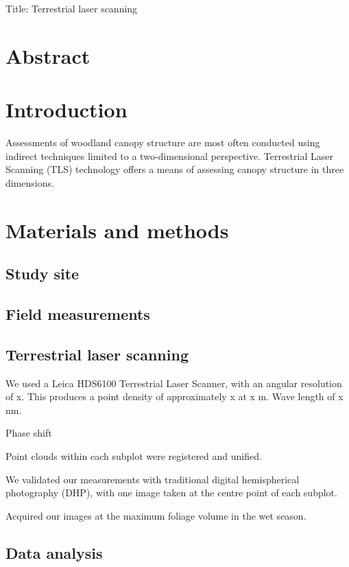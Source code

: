 \documentclass[11pt,a4paper]{article}
\newcommand{\titletext}{Terrestrial laser scanning}
\begin{document}
{\Large{Title: \titletext{}}}


\section*{Abstract}

\section{Introduction}

Assessments of woodland canopy structure are most often conducted using indirect techniques limited to a two-dimensional perspective. Terrestrial Laser Scanning (TLS) technology offers a means of assessing canopy structure in three dimensions.

\section{Materials and methods}

\subsection{Study site}

\subsection{Field measurements}

\subsection{Terrestrial laser scanning}

We used a Leica HDS6100 Terrestrial Laser Scanner, with an angular resolution of x. This produces a point density of approximately x at x m. Wave length of x nm.

Phase shift

Point clouds within each subplot were registered and unified.

We validated our measurements with traditional digital hemispherical photography (DHP), with one image taken at the centre point of each subplot.

Acquired our images at the maximum foliage volume in the wet season.

\subsection{Data analysis}
\end{document}
